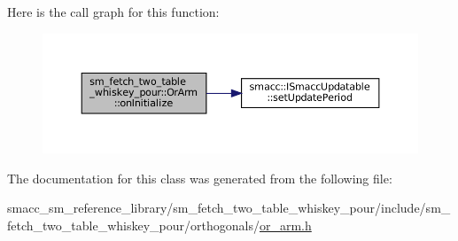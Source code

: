 Here is the call graph for this function\+:
\nopagebreak
\begin{figure}[H]
\begin{center}
\leavevmode
\includegraphics[width=350pt]{classsm__fetch__two__table__whiskey__pour_1_1OrArm_a8f222ade9f086bdba5732960ce889eeb_cgraph}
\end{center}
\end{figure}


The documentation for this class was generated from the following file\+:\begin{DoxyCompactItemize}
\item 
smacc\+\_\+sm\+\_\+reference\+\_\+library/sm\+\_\+fetch\+\_\+two\+\_\+table\+\_\+whiskey\+\_\+pour/include/sm\+\_\+fetch\+\_\+two\+\_\+table\+\_\+whiskey\+\_\+pour/orthogonals/\hyperlink{sm__fetch__two__table__whiskey__pour_2include_2sm__fetch__two__table__whiskey__pour_2orthogonals_2or__arm_8h}{or\+\_\+arm.\+h}\end{DoxyCompactItemize}
